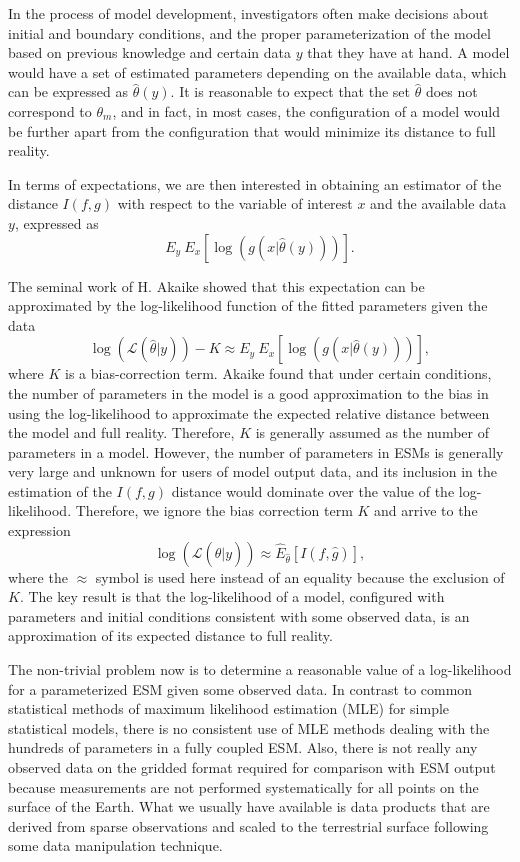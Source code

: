 \documentclass[gmd, manuscript]{copernicus}
\begin{document}
In the process of model development, investigators often make decisions about initial and boundary conditions, and the proper parameterization of the model based on previous knowledge and certain data $y$ that they have at hand. A model would have a set of estimated parameters depending on the available data, which can be expressed as $\hat{\theta} (y)$. It is reasonable to expect that the set $\hat{\theta}$ does not correspond to $\theta_m$, and in fact, in most cases, the configuration of a model would be further apart from the configuration that would minimize its distance to full reality. 

In terms of expectations, we are then interested in obtaining an estimator of the distance $I(f, g)$ with respect to the variable of interest $x$ and the available data $y$, expressed as
\begin{equation}
E_y \ E_x [\log(g(x | \hat{\theta}(y) ))].
\end{equation}

The seminal work of H. Akaike showed that this expectation can be approximated by the log-likelihood function of the fitted parameters given the data
\begin{equation}
\log (\mathcal{L}(\hat{\theta} | y) ) - K \approx E_y \ E_x [\log(g(x | \hat{\theta}(y) ))],
\end{equation}
where $K$ is a bias-correction term. Akaike found that under certain conditions, the number of parameters in the model is a good approximation to the bias in using the log-likelihood to approximate the expected relative distance between the model and full reality. Therefore, $K$ is generally assumed as the number of parameters in a model. 
However, the number of parameters in ESMs is generally very large and unknown for users of model output data, and its inclusion in the estimation of the $I(f, g)$ distance would dominate over the value of the log-likelihood. Therefore, we ignore the bias correction term $K$ and arrive to the expression
\begin{equation}
\log (\mathcal{L}(\hat{\theta} | y) ) \approx \hat{E}_{\hat{\theta}} [I(f, \hat{g})],
\end{equation}
where the $\approx$ symbol is used here instead of an equality because the exclusion of $K$. The key result is that the log-likelihood of a model, configured with parameters and initial conditions consistent with some observed data, is an approximation of its expected distance to full reality.

The non-trivial problem now is to determine a reasonable value of a log-likelihood for a parameterized ESM given some observed data. In contrast to common statistical methods of maximum likelihood estimation (MLE) for simple statistical models, there is no consistent use of MLE methods dealing with the hundreds of parameters in a fully coupled ESM. Also, there is not really any observed data on the gridded format required for comparison with ESM output because measurements are not performed systematically for all points on the surface of the Earth. What we usually have available is data products that are derived from sparse observations and scaled to the terrestrial surface following some data manipulation technique. 
\end{document}

